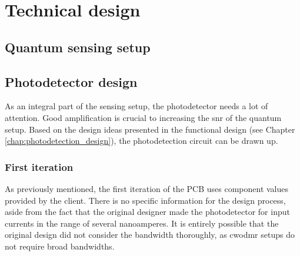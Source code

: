 \chapter{Technical design} \label{chap:tech_design}
\section{Quantum sensing setup}
\section{Photodetector design}\label{chap:td:tia_design}
As an integral part of the sensing setup, the photodetector needs a lot of attention. Good amplification is crucial to increasing the \gls{snr} of the quantum setup. Based on the design ideas presented in the functional design (see Chapter \ref{chap:photodetection_design}), the photodetection circuit can be drawn up.

\subsection{First iteration}
As previously mentioned, the first iteration of the PCB uses component values provided by the client. There is no specific information for the design process, aside from the fact that the original designer made the photodetector for input currents in the range of several nanoamperes. It is entirely possible that the original design did not consider the bandwidth thoroughly, as \gls{cwodmr} setups do not require broad bandwidths.

